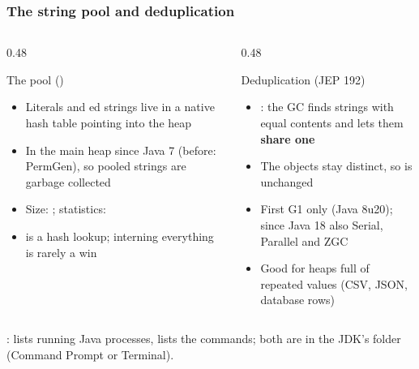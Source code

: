 \documentclass[aspectratio=169,10pt,compress]{beamer}
\begin{document}
\begin{frame}[t,fragile] \frametitle{The string pool and deduplication}
  \begin{columns}[T]
    \begin{column}{0.48\textwidth}
      \begin{block}{The pool ()}
        \small
        \begin{itemize}
        
          \item Literals and ed strings live in a native hash table pointing into the heap
          
          \item In the main heap since Java 7 (before: PermGen), so pooled strings are garbage collected
          
          \item Size: 
          ; statistics: 
          
          \item {} is a hash lookup; interning everything is rarely a win
          
        \end{itemize}
        
      \end{block}
    \end{column}
    \begin{column}{0.48\textwidth}
      \begin{block}{Deduplication (JEP 192)}
        \small
        \begin{itemize}
          \item {}: the GC finds strings with equal contents and lets them
                \textbf{share one} 
          \item The  objects stay distinct, so \hCode{==} is unchanged
          \item First G1 only (Java 8u20); since Java 18 also Serial, Parallel and ZGC
          \item Good for heaps full of repeated values (CSV, JSON, database rows)
        \end{itemize}
      \end{block}
    \end{column}
  \end{columns}
  \vspace{0.2em}
  \small {}: 
   lists running Java processes, 
   lists the commands;
  both are in the JDK's  folder (Command Prompt or Terminal).
\end{frame}
\end{document}
